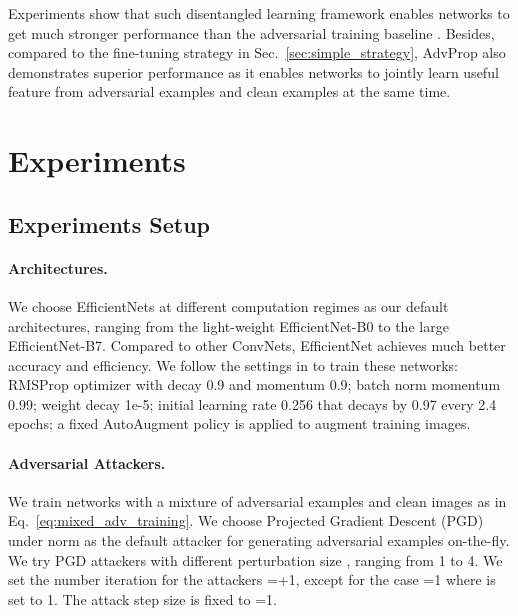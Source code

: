 \documentclass[10pt,twocolumn,letterpaper]{article}
\begin{document}
Experiments show that such disentangled learning framework enables networks to get much stronger performance than the adversarial training baseline \cite{Goodfellow2015,Kurakin2017}. Besides, compared to the fine-tuning strategy in Sec.~\ref{sec:simple_strategy}, AdvProp also demonstrates superior performance as it enables networks to jointly learn useful feature from adversarial examples and clean examples at the same time. 


\section{Experiments}
\subsection{Experiments Setup}
\paragraph{Architectures.} We choose EfficientNets \cite{Tan2019} at different computation regimes as our default architectures, ranging from the light-weight EfficientNet-B0 to the large EfficientNet-B7. Compared to other ConvNets, EfficientNet achieves much better accuracy and efficiency. We follow the settings in \cite{Tan2019} to train these networks: RMSProp optimizer with decay 0.9 and momentum 0.9; batch norm momentum 0.99; weight decay 1e-5; initial learning rate 0.256 that decays by 0.97 every 2.4 epochs; a fixed AutoAugment policy \cite{Cubuk2018} is applied to augment training images.


\paragraph{Adversarial Attackers.} We train networks with a mixture of adversarial examples and clean images as in Eq.~\eqref{eq:mixed_adv_training}. We choose Projected Gradient Descent (PGD) \cite{Madry2018} under   norm as the default attacker for generating adversarial examples on-the-fly. We try PGD attackers with different perturbation size , ranging from 1 to 4. We set the number iteration for the attackers =+1, except for the case =1 where  is set to 1. The attack step size is fixed to =1. 
\end{document}
